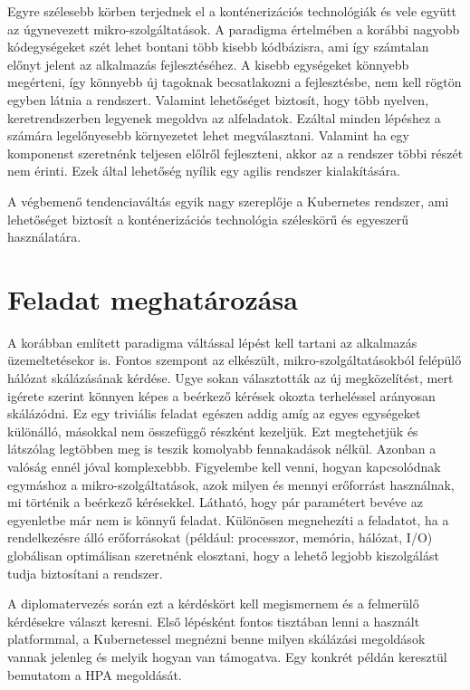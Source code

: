 Egyre szélesebb körben terjednek el a konténerizációs technológiák és vele együtt az úgynevezett mikro-szolgáltatások.
A paradigma értelmében a korábbi nagyobb kódegységeket szét lehet bontani több kisebb kódbázisra, ami így számtalan előnyt jelent az alkalmazás fejlesztéséhez.
A kisebb egységeket könnyebb megérteni, így könnyebb új tagoknak becsatlakozni a fejlesztésbe, nem kell rögtön egyben látnia a rendszert.
Valamint lehetőséget biztosít, hogy több nyelven, keretrendszerben legyenek megoldva az alfeladatok. Ezáltal minden lépéshez a számára legelőnyesebb környezetet lehet megválasztani. Valamint ha egy komponenst szeretnénk teljesen előlről fejleszteni, akkor az a rendszer többi részét nem érinti.
Ezek által lehetőség nyílik egy agilis rendszer kialakítására.

A végbemenő tendenciaváltás egyik nagy szereplője a Kubernetes rendszer, ami lehetőséget biztosít a konténerizációs technológia széleskörű és egyeszerű használatára.

\section{Feladat meghatározása}
A korábban említett paradigma váltással lépést kell tartani az alkalmazás üzemeltetésekor is. Fontos szempont az elkészült, mikro-szolgáltatásokból felépülő hálózat skálázásának kérdése. Ugye sokan választották az új megközelítést, mert igérete szerint könnyen képes a beérkező kérések okozta terheléssel arányosan skálázódni.
Ez egy triviális feladat egészen addig amíg az egyes egységeket különálló, másokkal nem összefüggő részként kezeljük.
Ezt megtehetjük és látszólag legtöbben meg is teszik komolyabb fennakadások nélkül. 
Azonban a valóság ennél jóval komplexebbb. Figyelembe kell venni, hogyan kapcsolódnak egymáshoz a mikro-szolgáltatások, azok milyen és mennyi erőforrást használnak, mi történik a beérkező kérésekkel.
Látható, hogy pár paramétert bevéve az egyenletbe már nem is könnyű feladat. 
Különösen megnehezíti a feladatot, ha a rendelkezésre álló erőforrásokat (például: processzor, memória, hálózat, I/O) globálisan optimálisan szeretnénk elosztani, hogy a lehető legjobb kiszolgálást tudja biztosítani a rendszer. 

A diplomatervezés során ezt a kérdéskört kell megismernem és a felmerülő kérdésekre választ keresni. Első lépésként fontos tisztában lenni a használt platformmal, a Kubernetessel megnézni benne milyen skálázási megoldások vannak jelenleg és melyik hogyan van támogatva. Egy konkrét példán keresztül bemutatom a HPA megoldását. 

